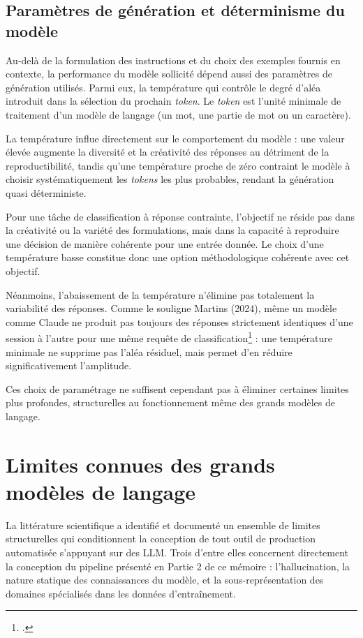 \subsection{Paramètres de génération et déterminisme du modèle}
\label{sec:fondamentaux-temperature}

Au-delà de la formulation des instructions et du choix des exemples fournis en contexte, la performance du modèle sollicité dépend aussi des paramètres de génération utilisés. Parmi eux, la température qui contrôle le degré d'aléa introduit dans la sélection du prochain \textit{token}. Le \textit{token}  est l'unité minimale de traitement d'un modèle de langage (un mot, une partie de mot ou un caractère).

La température influe directement sur le comportement du modèle : une valeur élevée augmente la diversité et la créativité des réponses au détriment de la reproductibilité, tandis qu'une température proche de zéro contraint le modèle à choisir systématiquement les \textit{tokens} les plus probables, rendant la génération quasi déterministe.

Pour une tâche de classification à réponse contrainte, l'objectif ne réside pas dans la créativité ou la variété des formulations, mais dans la capacité à reproduire une décision de manière cohérente pour une entrée donnée. Le choix d'une température basse constitue donc une option méthodologique cohérente avec cet objectif.

Néanmoins, l'abaissement de la température n'élimine pas totalement la variabilité des réponses. Comme le souligne Martins (2024), même un modèle comme Claude ne produit pas toujours des réponses strictement identiques d'une session à l'autre pour une même requête de classification\footcite{martins2024} : une température minimale ne supprime pas l'aléa résiduel, mais permet d'en réduire significativement l'amplitude.

Ces choix de paramétrage ne suffisent cependant pas à éliminer certaines limites plus profondes, structurelles au fonctionnement même des grands modèles de langage.

\section{Limites connues des grands modèles de langage}
\label{sec:limites-llm}

La littérature scientifique a identifié et documenté un ensemble de limites structurelles qui conditionnent la conception de tout outil de production automatisée s'appuyant sur des LLM. Trois d'entre elles concernent directement la conception du pipeline présenté en Partie 2 de ce mémoire : l'hallucination, la nature statique des connaissances du modèle, et la sous-représentation des domaines spécialisés dans les données d'entraînement.

